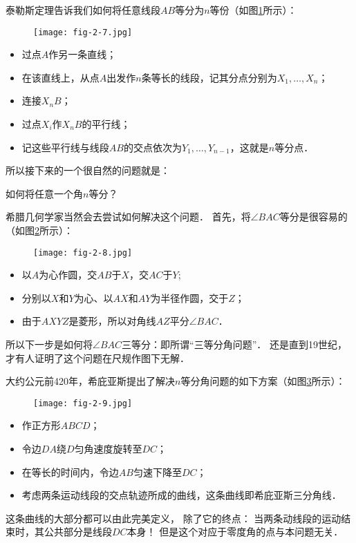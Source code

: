 \documentclass[cn,fancy,blue,11pt]{elegantbook}
\begin{document}
泰勒斯定理告诉我们如何将任意线段$AB$等分为$n$等份（如图\ref{fig:2-7}所示）：
\begin{figure}[htbp]
	\centering
	\texttt{[image: fig-2-7.jpg]}
	\caption{\label{fig:2-7}}
\end{figure}
\begin{itemize}
	\item 过点$A$作另一条直线；
	\item 在该直线上，从点$A$出发作$n$条等长的线段，记其分点分别为$X_1,\dots,X_n$；
	\item 连接$X_nB$；
	\item 过点$X_i$作$X_nB$的平行线；
	\item 记这些平行线与线段$AB$的交点依次为$Y_1,\dots,Y_{n-1}$，这就是$n$等分点．
\end{itemize}
所以接下来的一个很自然的问题就是：
\begin{framed}
	如何将任意一个角$n$等分？
\end{framed}
希腊几何学家当然会去尝试如何解决这个问题．
首先，将$\angle BAC$等分是很容易的（如图\ref{fig:2-8}所示）：
\begin{figure}[htbp]
	\centering
	\texttt{[image: fig-2-8.jpg]}
	\caption{\label{fig:2-8}}
\end{figure}
\begin{itemize}
	\item 以$A$为心作圆，交$AB$于$X$，交$AC$于$Y$;
	\item 分别以$X$和$Y$为心、以$AX$和$AY$为半径作圆，交于$Z$；
	\item 由于$AXYZ$是菱形，所以对角线$AZ$平分$\angle BAC$．
\end{itemize}
所以下一步是如何将$\angle BAC$三等分：即所谓``三等分角问题''．
还是直到19世纪，才有人证明了这个问题在尺规作图下无解．

大约公元前420年，希庇亚斯提出了解决$n$等分角问题的如下方案（如图\ref{fig:2-9}所示）：
\begin{figure}[htbp]
	\centering
	\texttt{[image: fig-2-9.jpg]}
	\caption{\label{fig:2-9}}
\end{figure}
\begin{itemize}
	\item 作正方形$ABCD$；
	\item 令边$DA$绕$D$匀角速度旋转至$DC$；
	\item 在等长的时间内，令边$AB$匀速下降至$DC$；
	\item 考虑两条运动线段的交点轨迹所成的曲线，这条曲线即希庇亚斯三分角线．
\end{itemize}
这条曲线的大部分都可以由此完美定义，
除了它的终点：
当两条动线段的运动结束时，其公共部分是线段$DC$本身！
但是这个对应于零度角的点与本问题无关．
\end{document}
